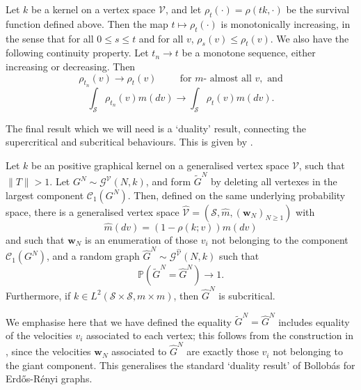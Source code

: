    \begin{theorem}\label{thrm: continuity of rho} Let $k$ be a kernel on a vertex space $\mathcal{V}$, and let $\rho_t(\cdot)=\rho(tk,\cdot)$ be the survival function defined above. Then the map $t\mapsto \rho_t(\cdot)$ is monotonically increasing, in the sense that for all $0\leq s \leq t$ and for all $v$, $\rho_s(v)\le \rho_t(v).$ We also have the following continuity property. Let $t_n\rightarrow t$ be a monotone sequence, either increasing or decreasing. Then \begin{equation}
       \rho_{t_n}(v)\rightarrow \rho_t(v) \hspace{1cm} \text{for $m$- almost all }v, \text{ and}
   \end{equation} \begin{equation}
       \int_{\mathcal{S}}\rho_{t_n}(v)m(dv)\rightarrow \int_{\mathcal{S}}\rho_t(v)m(dv).
   \end{equation} \end{theorem} The final result which we will need is a `duality' result, connecting the supercritical and subcritical behaviours. This is given by \cite[Theorem 12.1]{BJR07}.
   \begin{theorem}\label{thrm: coupling supercritical and subcritical} Let $k$ be an positive graphical kernel on a generalised vertex space $\mathcal{V}$, such that $\|T\|>1$. Let $G^N \sim \mathcal{G}^\mathcal{V}(N, k)$, and form $\widetilde{G}^N$ by deleting all vertexes in the largest component $\mathcal{C}_1(G^N).$ Then, defined on the same underlying probability space, there is a generalised vertex space $\widehat{\mathcal{V}}=(\mathcal{S}, \widehat{m}, (\mathbf{w}_N)_{N\geq 1})$ with \begin{equation}
       \widehat{m}(dv)=(1-\rho(k;v))m(dv)
   \end{equation} and such that $\mathbf{w}_N$ is an enumeration of those $v_i$ not belonging to the component $\mathcal{C}_1(G^N)$, and a random graph $\widehat{G}^N \sim \mathcal{G}^{\widehat{\mathcal{V}}}(N,k)$ such that \begin{equation}
       \mathbb{P}(\widetilde{G}^N=\widehat{G}^N)\rightarrow 1.
   \end{equation}  Furthermore, if $k\in L^2(\mathcal{S}\times \mathcal{S}, m\times m)$, then $\widehat{G}^N$ is subcritical.\end{theorem} We emphasise here that we have defined the equality $\widetilde{G}^N=\widehat{G}^N$ includes equality of the velocities $v_i$ associated to each vertex; this follows from the construction in \cite{BJR07}, since the velocities $\mathbf{w}_N$ associated to $\widehat{G}^N$ are exactly those $v_i$ not belonging to the giant component. This generalises the standard `duality result' of Bollob\'as \cite{BB84} for Erd\H{o}s-R\'enyi graphs. 